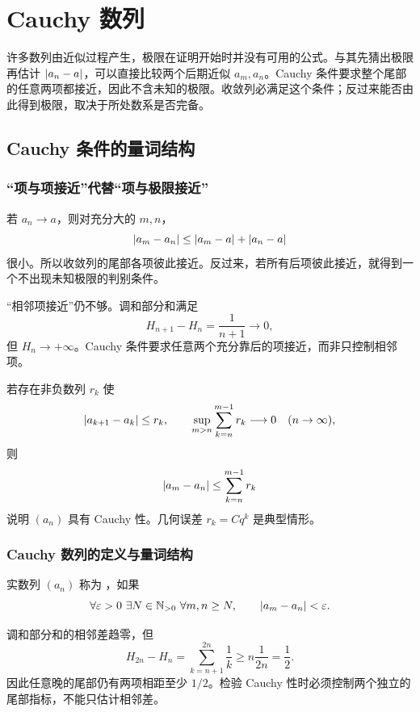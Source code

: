 \chapter{Cauchy 数列}
\label{chap:cauchy-criterion}

许多数列由近似过程产生，极限在证明开始时并没有可用的公式。与其先猜出极限再估计 \(\left|a_n-a\right|\)，可以直接比较两个后期近似 \(a_m,a_n\)。Cauchy 条件要求整个尾部的任意两项都接近，因此不含未知的极限。收敛列必满足这个条件；反过来能否由此得到极限，取决于所处数系是否完备。

\section{Cauchy 条件的量词结构}

\subsection{“项与项接近”代替“项与极限接近”}


若 \(a_n\to a\)，则对充分大的 \(m,n\)，
\[
 \left|a_m-a_n\right|
 \le\left|a_m-a\right|+\left|a_n-a\right|
\]
很小。所以收敛列的尾部各项彼此接近。反过来，若所有后项彼此接近，就得到一个不出现未知极限的判别条件。

“相邻项接近”仍不够。调和部分和满足
\[
 H_{n+1}-H_n=\frac1{n+1}\to0,
\]
但 \(H_n\to+\infty\)。Cauchy 条件要求任意两个充分靠后的项接近，而非只控制相邻项。

\begin{example}
若存在非负数列 \(r_k\) 使
\[
 \left|a_{k+1}-a_k\right|\le r_k,\qquad
 \sup_{m>n}\sum_{k=n}^{m-1}r_k\longrightarrow0
 \quad(n\to\infty),
\]
则
\[
 \left|a_m-a_n\right|\le\sum_{k=n}^{m-1}r_k
\]
说明 \((a_n)\) 具有 Cauchy 性。几何误差 \(r_k=Cq^k\) 是典型情形。
\end{example}

\subsection{Cauchy 数列的定义与量词结构}


\begin{definition}
实数列 \((a_n)\) 称为 ，如果
\[
\forall\varepsilon>0\ \exists N\in\Npos\
 \forall m,n\ge N,\qquad
 \abs{a_m-a_n}<\varepsilon.
\]
\end{definition}

调和部分和的相邻差趋零，但
\[
 H_{2n}-H_n=\sum_{k=n+1}^{2n}\frac1k\ge n\frac1{2n}=\frac12.
\]
因此任意晚的尾部仍有两项相距至少 \(1/2\)。检验 Cauchy 性时必须控制两个独立的尾部指标，不能只估计相邻差。

